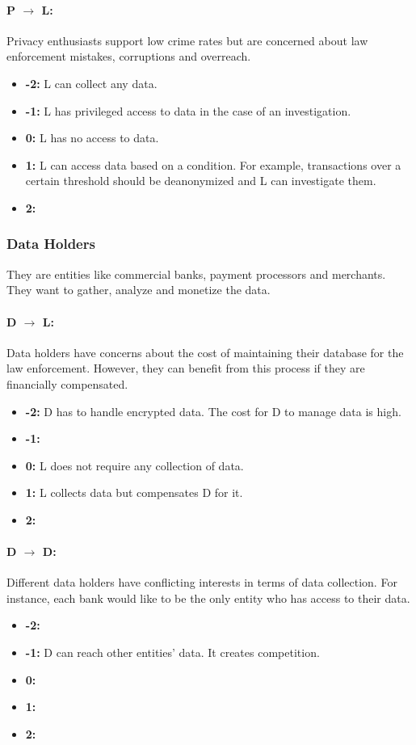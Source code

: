 \documentclass[runningheads]{llncs}
\begin{document}
\paragraph{P $\rightarrow$ L:} Privacy enthusiasts support low crime rates but are concerned about law enforcement mistakes, corruptions and overreach.
   \begin{itemize}
	\item \textbf{-2:} L can collect any data.
	\item \textbf{-1:} L has privileged access to data in the case of an investigation.
	\item \textbf{0:} L has no access to data.
	\item \textbf{1:} L can access data based on a condition. For example, transactions over a certain threshold should be deanonymized and L can investigate them.
	\item \textbf{2:} 
\end{itemize}

 \subsubsection{Data Holders} 
 They are entities like commercial banks, payment processors and merchants. They want to gather, analyze and monetize the data.
 \paragraph{D $\rightarrow$ L:}
 Data holders have concerns about the cost of maintaining their database for the law enforcement. However, they can benefit from this process if they are financially compensated.
   \begin{itemize}
 	\item \textbf{-2:} D has to handle encrypted data. The cost for D to manage data is high.
 	\item \textbf{-1:}
 	\item \textbf{0:} L does not require any collection of data.
 	\item \textbf{1:} L collects data but compensates D for it.
 	\item \textbf{2:} 
 \end{itemize}
  \paragraph{D $\rightarrow$ D:}
 Different data holders have conflicting interests in terms of data collection. For instance, each bank would like to be the only entity who has access to their data.
    \begin{itemize}
 	\item \textbf{-2:} 
 	\item \textbf{-1:} D can reach other entities' data. It creates competition.
 	\item \textbf{0:} 
 	\item \textbf{1:}
 	\item \textbf{2:} 
 \end{itemize}
 
\end{document}
